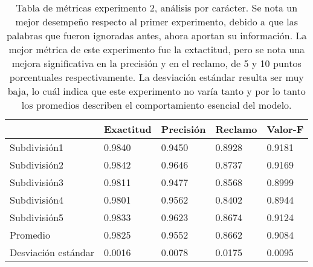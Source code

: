 \begin{table}[h]
    \centering
    \caption{Tabla de métricas experimento 2, análisis por carácter. Se nota un mejor desempeño respecto al primer experimento, debido a que las palabras que fueron ignoradas antes, ahora aportan su información. La mejor métrica de este experimento fue la extactitud, pero se nota una mejora significativa en la precisión y en el reclamo, de 5 y 10 puntos porcentuales respectivamente. La desviación estándar resulta ser muy baja, lo cuál indica que este experimento no varía tanto y por lo tanto los promedios describen el comportamiento esencial del modelo. }
\begin{tabular}{|l|llll|}
\hline
                        & Exactitud &     Precisión &     Reclamo  &   Valor-F \\ \hline
              
Subdivisión1            &       0.9840  &       0.9450  &       0.8928  &       0.9181  \\ 
Subdivisión2            &       0.9842  &       0.9646  &       0.8737  &       0.9169  \\ 
Subdivisión3            &       0.9811  &       0.9477  &       0.8568  &       0.8999  \\ 
Subdivisión4            &       0.9801  &       0.9562  &       0.8402  &       0.8944  \\ 
Subdivisión5            &       0.9833  &       0.9623  &       0.8674  &       0.9124  \\ \hline
Promedio                &       0.9825  &       0.9552  &       0.8662  &       0.9084  \\ \hline
Desviación estándar     &       0.0016  &       0.0078  &       0.0175  &       0.0095  \\ \hline
              
\end{tabular}
		     \label{tab:exp2}
\end{table}